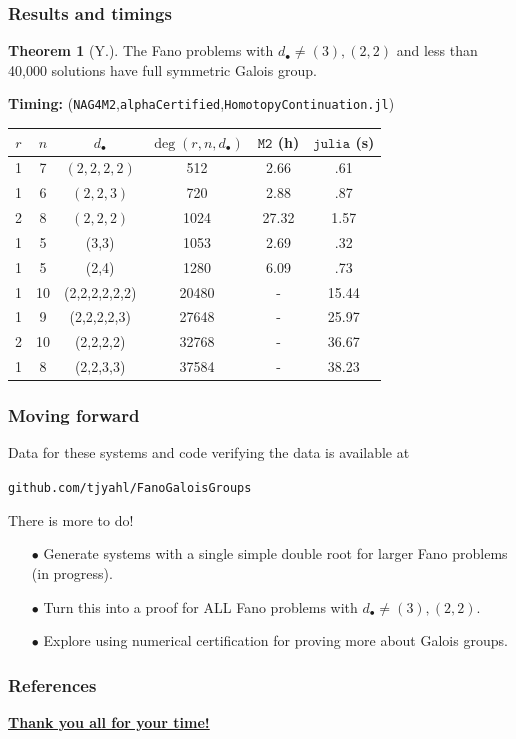 \documentclass{beamer}
\theoremstyle{definition}
\newtheorem{thm}{Theorem}
\begin{document}
\begin{frame}
\frametitle{Results and timings}
\begin{thm}[Y.] 
\vspace{.01cm}
The Fano problems with $d_\bullet\ne (3),(2,2)$ and less than 40,000 solutions have full symmetric Galois group.
\end{thm}
\vspace{-.1cm}
\textbf{Timing:} (\texttt{NAG4M2},\texttt{alphaCertified},\texttt{HomotopyContinuation.jl})
\vspace{-.2cm}
\begin{table}[htb]
  \label{Small Fano}
  \def\arraystretch{.98}
  \begin{tabular}{||c|c|c|c|c|c||}
    \hline
    $r$ & $n$ & $d_\bullet$ & $\deg(r,n,d_\bullet)$ & $\texttt{M2}$ (h) & $\texttt{julia}$ (s)\\
    \hline\hline
    1 & 7 & $(2,2,2,2)$ & 512 & 2.66 & .61\\
    \hline
    1 & 6 & $(2,2,3)$ & 720  & 2.88 & .87\\
    \hline
    2 & 8 & $(2,2,2)$ & 1024 & 27.32 & 1.57\\
    \hline
    1 & 5 & (3,3) & 1053 & 2.69 & .32\\
    \hline
    1 & 5 & (2,4) & 1280 & 6.09 & .73\\
    \hline
    1 & 10 & (2,2,2,2,2,2) & 20480 & - & 15.44\\
    \hline
    1 & 9 & (2,2,2,2,3) & 27648 & - & 25.97\\
    \hline
    2 & 10 & (2,2,2,2) & 32768 & - & 36.67\\
    \hline
    1 & 8 & (2,2,3,3) & 37584 & - & 38.23\\
    \hline
  \end{tabular}
\end{table}
\end{frame}



%
\begin{frame}
\frametitle{Moving forward}
Data for these systems and code verifying the data is available at 
\vspace{-.25cm}
\begin{center}
\texttt{github.com/tjyahl/FanoGaloisGroups}
\end{center}
\vspace{-.25cm}
There is more to do!
\begin{enumerate}
\item[$\bullet$] Generate systems with a single simple double root for larger Fano problems (in progress).

\item[$\bullet$] Turn this into a proof for ALL Fano problems with $d_\bullet\ne(3),(2,2)$.

\item[$\bullet$] Explore using numerical certification for proving more about Galois groups.
\end{enumerate}
\end{frame}


\begin{frame}
\frametitle{References}
\begin{center}
\textbf{\underline{Thank you all for your time!}}
\end{center}
\end{frame}
\end{document}
